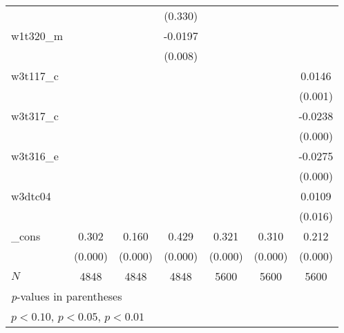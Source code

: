 {\begin{tabular}{l*{6}{c}}
            &                     &                     &     (0.330)         &                     &                     &                     \\
[1em]
w1t320\_m    &                     &                     &     -0.0197\sym{***}&                     &                     &                     \\
            &                     &                     &     (0.008)         &                     &                     &                     \\
[1em]
w3t117\_c    &                     &                     &                     &                     &                     &      0.0146\sym{***}\\
            &                     &                     &                     &                     &                     &     (0.001)         \\
[1em]
w3t317\_c    &                     &                     &                     &                     &                     &     -0.0238\sym{***}\\
            &                     &                     &                     &                     &                     &     (0.000)         \\
[1em]
w3t316\_e    &                     &                     &                     &                     &                     &     -0.0275\sym{***}\\
            &                     &                     &                     &                     &                     &     (0.000)         \\
[1em]
w3dtc04     &                     &                     &                     &                     &                     &      0.0109\sym{**} \\
            &                     &                     &                     &                     &                     &     (0.016)         \\
[1em]
\_cons      &       0.302\sym{***}&       0.160\sym{***}&       0.429\sym{***}&       0.321\sym{***}&       0.310\sym{***}&       0.212\sym{***}\\
            &     (0.000)         &     (0.000)         &     (0.000)         &     (0.000)         &     (0.000)         &     (0.000)         \\
\hline
\(N\)       &        4848         &        4848         &        4848         &        5600         &        5600         &        5600         \\
\hline\hline
\multicolumn{7}{l}{\footnotesize \textit{p}-values in parentheses}\\
\multicolumn{7}{l}{\footnotesize \sym{*} \(p<0.10\), \sym{**} \(p<0.05\), \sym{***} \(p<0.01\)}\\
\end{tabular}
}

